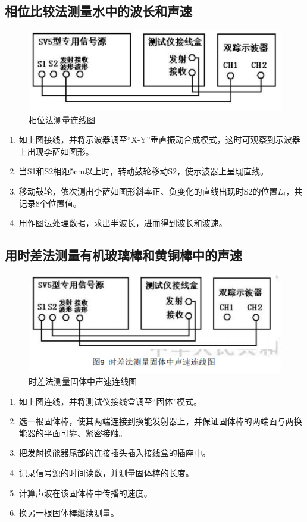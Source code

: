 \documentclass[UTF8]{ctexart}
\begin{document}
\subsection{相位比较法测量水中的波长和声速}
\begin{figure}[h]
    \centering
    \includegraphics[scale=1]{相位法测量连线图.PNG}
    \caption{相位法测量连线图}
\end{figure}
\begin{enumerate}
    \item 如上图接线，并将示波器调至“X-Y”垂直振动合成模式，这时可观察到示波器上出现李萨如图形。
    \item 当S1和S2相距5cm以上时，转动鼓轮移动S2，使示波器上呈现直线。
    \item 移动鼓轮，依次测出李萨如图形斜率正、负变化的直线出现时S2的位置$L_i$，共记录8个位置值。
    \item 用作图法处理数据，求出半波长，进而得到波长和波速。
\end{enumerate}
\subsection{用时差法测量有机玻璃棒和黄铜棒中的声速}
\begin{figure}[h]
    \centering
    \includegraphics[scale=1]{时差法接线图.PNG}
    \caption{时差法测量固体中声速连线图}
\end{figure}
\newpage
\begin{enumerate}
    \item 如上图连线，并将测试仪接线盒调至“固体”模式。
    \item 选一根固体棒，使其两端连接到换能发射器上，并保证固体棒的两端面与两换能器的平面可靠、紧密接触。
    \item 把发射换能器尾部的连接插头插入接线盒的插座中。
    \item 记录信号源的时间读数，并测量固体棒的长度。
    \item 计算声波在该固体棒中传播的速度。
    \item 换另一根固体棒继续测量。
\end{enumerate}
\end{document}
